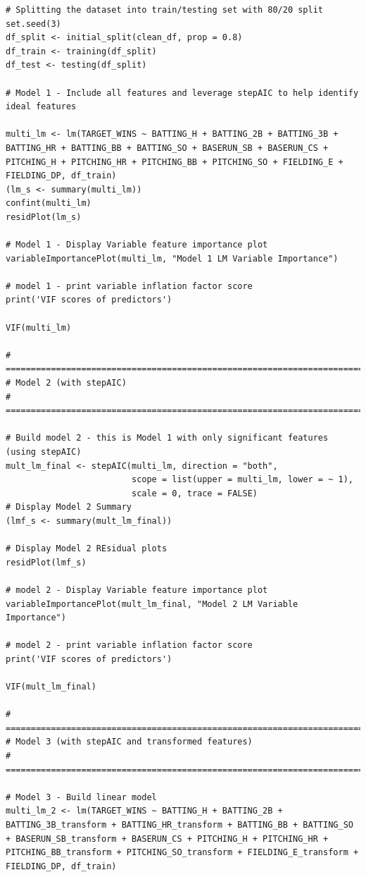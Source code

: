 \documentclass[
]{article}
\begin{document}
\begin{verbatim}
# Splitting the dataset into train/testing set with 80/20 split
set.seed(3)
df_split <- initial_split(clean_df, prop = 0.8)
df_train <- training(df_split)
df_test <- testing(df_split)

# Model 1 - Include all features and leverage stepAIC to help identify ideal features

multi_lm <- lm(TARGET_WINS ~ BATTING_H + BATTING_2B + BATTING_3B + BATTING_HR + BATTING_BB + BATTING_SO + BASERUN_SB + BASERUN_CS + PITCHING_H + PITCHING_HR + PITCHING_BB + PITCHING_SO + FIELDING_E + FIELDING_DP, df_train)
(lm_s <- summary(multi_lm))
confint(multi_lm)
residPlot(lm_s)

# Model 1 - Display Variable feature importance plot
variableImportancePlot(multi_lm, "Model 1 LM Variable Importance")

# model 1 - print variable inflation factor score
print('VIF scores of predictors')

VIF(multi_lm)

# =====================================================================================
# Model 2 (with stepAIC)
# =====================================================================================

# Build model 2 - this is Model 1 with only significant features (using stepAIC)
mult_lm_final <- stepAIC(multi_lm, direction = "both",
                         scope = list(upper = multi_lm, lower = ~ 1),
                         scale = 0, trace = FALSE)
# Display Model 2 Summary
(lmf_s <- summary(mult_lm_final))

# Display Model 2 REsidual plots
residPlot(lmf_s)

# model 2 - Display Variable feature importance plot
variableImportancePlot(mult_lm_final, "Model 2 LM Variable Importance")

# model 2 - print variable inflation factor score
print('VIF scores of predictors')

VIF(mult_lm_final)

# =====================================================================================
# Model 3 (with stepAIC and transformed features)
# =====================================================================================

# Model 3 - Build linear model
multi_lm_2 <- lm(TARGET_WINS ~ BATTING_H + BATTING_2B + BATTING_3B_transform + BATTING_HR_transform + BATTING_BB + BATTING_SO + BASERUN_SB_transform + BASERUN_CS + PITCHING_H + PITCHING_HR + PITCHING_BB_transform + PITCHING_SO_transform + FIELDING_E_transform + FIELDING_DP, df_train)


\end{verbatim}
\end{document}
